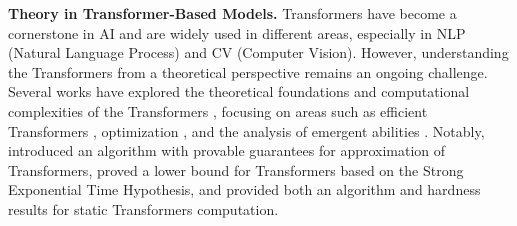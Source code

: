 {\bf Theory in Transformer-Based Models.}
Transformers have become a cornerstone in AI and are widely used in different areas, especially in NLP (Natural Language Process) and CV (Computer Vision). However, understanding the Transformers from a theoretical perspective remains an ongoing challenge. Several works have explored the theoretical foundations and computational complexities of the Transformers 
\ifdefined\isarxiv
\cite{tby+19,zhdk23,bsz23,as24,syz24,cll+24_rope,hlsl24,mosw22,szz24,als19_icml,dhs+22,bpsw21,syz21,als+23,dsxy23,kls+24,lswy23,gls+24}, 
\else
\cite{tby+19,zhdk23,bsz23,as24,syz24,cll+24_rope,hlsl24,mosw22,szz24,als19_icml,dhs+22,bpsw21,syz21,als+23,dsxy23}
\fi
focusing on areas such as efficient Transformers \cite{hjk+23,smn+24,szz+21,lll21,lls+24_conv,lssz24_tat,lss+24,llss24_sparse,lls+24_prune,cls+24,lls+24_io,hwsl24,hwl24,hcl+24,whhl24,hyw+23,as24_arxiv,gswy23}, optimization \cite{dls23, csy24}, and the analysis of emergent abilities \cite{bmr+20,wtb+22,al23,j23,xsw+23,lls+24_grok,xsl24,cll+24,lss+24_relu,hwg+24,wsh+24, dsy24_b}. Notably, \cite{zhdk23, dsy24_a} introduced an algorithm with provable guarantees for approximation of Transformers, \cite{kwh23} proved a lower bound for Transformers based on the Strong Exponential Time Hypothesis, and \cite{as24} provided both an algorithm and hardness results for static Transformers computation.
\ifdefined\isarxiv
\else
\vspace{-3mm}
\fi
